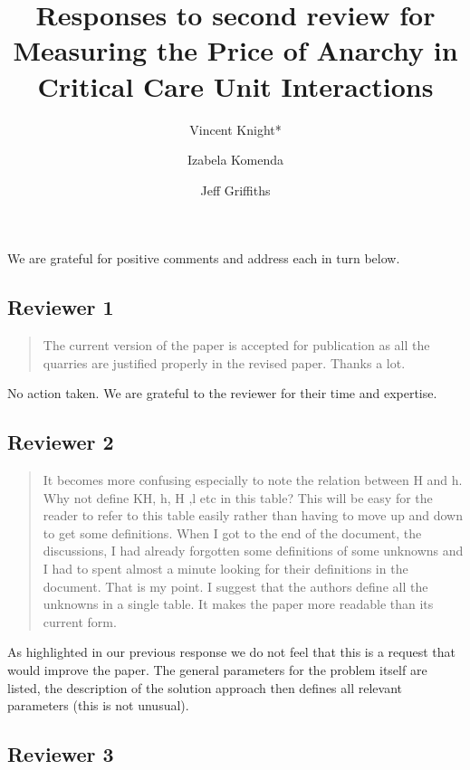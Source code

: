 \documentclass{article}
\title{Responses to second review for Measuring the Price of Anarchy in Critical Care Unit Interactions}
\author{Vincent Knight*
    \and
        Izabela Komenda
    \and
        Jeff Griffiths}
\begin{document}
\maketitle

We are grateful for positive comments and address each in turn below.

\subsection{Reviewer 1}

\begin{quote}
    \begin{textit}{
            The current version of the paper is accepted for publication as all
            the quarries are justified properly in the revised paper. Thanks a
            lot.
    }\end{textit}
\end{quote}

No action taken. We are grateful to the reviewer for their time and expertise.

\subsection{Reviewer 2}

\begin{quote}
    \begin{textit}{
It becomes more confusing especially to note the relation between H and h. Why not define KH, h, H ,l etc in this table? This will be easy for the reader to refer to this table easily rather than having to move up and down to get some definitions. When I got to the end of the document, the discussions, I had already forgotten some definitions of some unknowns and I had to spent almost a minute looking for their definitions in the document. That is my point. I suggest that the authors define all the unknowns in a single table. It makes the paper more readable than its current form.
    }\end{textit}
\end{quote}

As highlighted in our previous response we do not feel that this is a request
that would improve the paper. The general parameters for the problem itself are
listed, the description of the solution approach then defines all relevant
parameters (this is not unusual).

\subsection{Reviewer 3}
\end{document}
